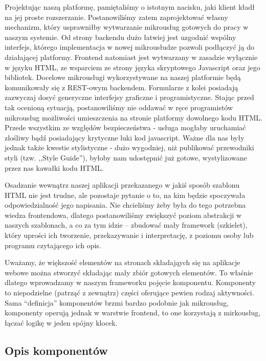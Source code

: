 \documentclass[licencjacka]{pracamgr}
\begin{document}
Projektując naszą platformę, pamiętaliśmy o istotnym nacisku, jaki klient kładł na jej proste rozszerzanie.
Postanowiliśmy zatem zaprojektować własny mechanizm, który usprawniłby wytwarzanie mikrousług gotowych do pracy w naszym systemie.
Od strony backendu dużo łatwiej jest uzgodnić wspólny interfejs, którego implementacja w nowej mikrousłudze pozwoli podłączyć ją do działającej platformy.
Frontend natomiast jest wytwarzany w zasadzie wyłącznie w języku HTML, ze wsparciem ze strony języka skryptowego Javascript oraz jego bibliotek.
Docelowe mikrousługi wykorzystywane na naszej platformie będą komunikowały się z REST-owym backendem.
Formularze z kolei posiadają zazwyczaj dosyć generyczne interfejsy graficzne i programistyczne.
Stając przed tak ocenioną sytuacją, postanowiliśmy nie oddawać w ręce programistów mikrousług możliwości umieszczenia na stronie platformy dowolnego kodu HTML.
Przede wszystkim ze względów bezpieczeństwa - usługa mogłaby uruchamiać zlośliwy bądź posiadający krytyczne luki kod javascript.
Ważne dla nas były jednak także kwestie stylistyczne - dużo wygodniej, niż publikować przewodniki styli (tzw. ,,Style Guide''),
byłoby nam udostępnić już gotowe, wystylizowane przez nas kawałki kodu HTML.

Osadzanie wewnątrz naszej aplikacji przekazanego w jakiś sposób szablonu HTML nie jest trudne, ale pozostaje pytanie o to,
na kim będzie spoczywała odpowiedzialność jego napisania. Nie chcieliśmy
żeby była do tego potrzebna wiedza frontendowa,
dlatego postanowiliśmy zwiększyć poziom abstrakcji w naszych szablonach,
a co za tym idzie -- zbudować mały framework (szkielet),
który uprości ich tworzenie, przekazywanie i interpretację, z poziomu osoby lub programu czytającego ich opis.

Uważamy, że większość elementów na stronach składająych się na aplikacje webowe można stworzyć składając mały zbiór gotowych elementów.
To właśnie dlatego wprowadzamy w naszym frameworku pojęcie komponentu. Komponenty to niepodzielne (patrząć z zewnątrz) części oferujące
pewien rodzaj aktywności. Sama ``definicja'' komponentów brzmi bardzo podobnie jak mikrousług, komponenty operują jednak w warstwie frontend,
to one korzystają z mirkousług, łączać logikę w jeden spójny klocek.

\subsection{Opis komponentów}
\end{document}
